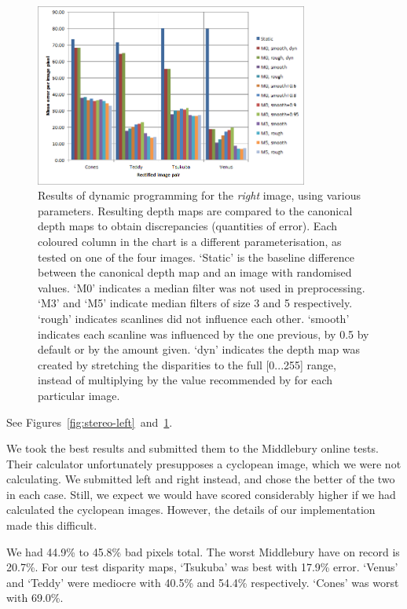 \begin{figure}[h]
  \centering
  \includegraphics[width=0.8\textwidth]{Stereo-right-report}
  \caption[Results of dynamic programming (left image)]{Results of dynamic
    programming for the \emph{right} image, using various parameters. Resulting
    depth maps are compared to the canonical depth maps to obtain discrepancies
    (quantities of error). Each coloured column in the chart is a different
    parameterisation, as tested on one of the four images. `Static' is the
    baseline difference between the canonical depth map and an image with
    randomised values. `M0' indicates a median filter was not used in
    preprocessing. `M3' and `M5' indicate median filters of size 3 and 5
    respectively. `rough' indicates scanlines did not influence each other.
    `smooth' indicates each scanline was influenced by the one previous, by 0.5
    by default or by the amount given. `dyn' indicates the depth map was created
    by stretching the disparities to the full [0...255] range, instead of
    multiplying by the value recommended by \cite{middlebury} for each particular image.}
  \label{fig:stereo-right}
\end{figure}

See Figures~\ref{fig:stereo-left}~and~\ref{fig:stereo-right}.

We took the best results and submitted them to the Middlebury online tests. \cite{stereocorrespondence, middlebury} Their calculator unfortunately presupposes a cyclopean image, which we were not calculating. We submitted left and right instead, and chose the better of the two in each case. Still, we expect we would have scored considerably higher if we had calculated the cyclopean images. However, the details of our implementation made this difficult.

We had 44.9\% to 45.8\% bad pixels total. The worst Middlebury have on record is 20.7\%. \cite{stereocorrespondence, middlebury} For our test disparity maps, `Tsukuba' was best with 17.9\% error. `Venus' and `Teddy' were mediocre with 40.5\% and 54.4\% respectively. `Cones' was worst with 69.0\%.

